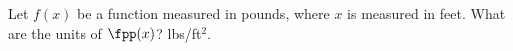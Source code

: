 {Let $f(x)$ be a function measured in pounds, where $x$ is measured in feet. What are the units of $\fpp(x)$?
}
{lbs/ft$^2$.
}
